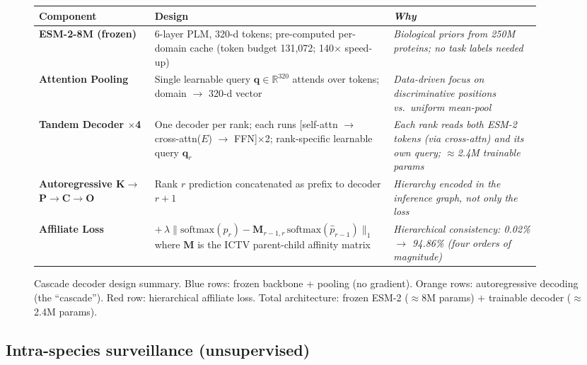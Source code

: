 \documentclass{article}
\begin{document}
\begin{figure}[!htbp]
\centering
\renewcommand{\arraystretch}{1.1}
\begin{tabular}{>{\bfseries\small}p{0.22\linewidth}
                >{\small}p{0.41\linewidth}
                >{\small\itshape}p{0.28\linewidth}}
\toprule
\textbf{Component} & \textbf{Design} & \textbf{Why} \\
\midrule
ESM-2-8M (frozen) &
  6-layer PLM, 320-d tokens; pre-computed per-domain cache
  (token budget 131{,}072; 140$\times$ speed-up) &
  Biological priors from 250M proteins; no task labels needed \\

Attention Pooling &
  Single learnable query $\mathbf{q}\!\in\!\mathbb{R}^{320}$ attends over tokens;
  domain $\to$ 320-d vector &
  Data-driven focus on discriminative positions vs.\ uniform mean-pool \\
\midrule
Tandem Decoder $\times$4 &
  One decoder per rank; each runs
  [self-attn $\to$ cross-attn($E$) $\to$ FFN]$\times$2;
  rank-specific learnable query $\mathbf{q}_r$ &
  Each rank reads both ESM-2 tokens (via cross-attn) and
  its own query; $\approx$2.4M trainable params \\

Autoregressive K$\to$P$\to$C$\to$O &
  Rank $r$ prediction concatenated as prefix to decoder $r{+}1$ &
  Hierarchy encoded in the \emph{inference graph},
  not only the loss \\
\midrule
Affiliate Loss &
  $+\,\lambda\|\mathrm{softmax}(\hat{p}_r) -
  \mathbf{M}_{r-1,r}\,\mathrm{softmax}(\hat{p}_{r-1})\|_1$
  where $\mathbf{M}$ is the ICTV parent-child affinity matrix &
  Hierarchical consistency: 0.02\% $\to$ 94.86\%
  (four orders of magnitude) \\
\bottomrule
\end{tabular}
\caption{Cascade decoder design summary. Blue rows: frozen backbone + pooling (no gradient). Orange rows: autoregressive decoding (the ``cascade''). Red row: hierarchical affiliate loss. Total architecture: frozen ESM-2 ($\approx$8M params) $+$ trainable decoder ($\approx$2.4M params).}
\label{fig:arch}
\end{figure}

\subsection{Intra-species surveillance (unsupervised)}
\end{document}
